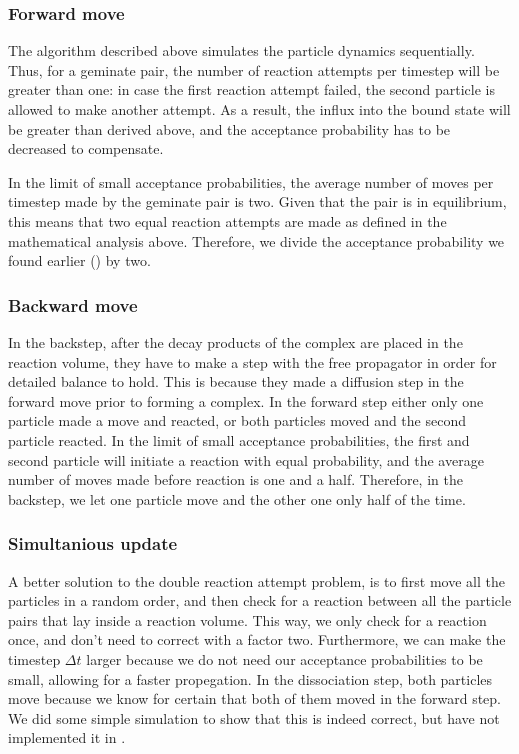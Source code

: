 \subsubsection{Forward move}
The algorithm described above simulates the particle dynamics sequentially. Thus, for a geminate pair, the number of reaction attempts per timestep will be greater than one: in case the first reaction attempt failed, the second particle is allowed to make another attempt. As a result, the influx into the bound state will be greater than derived above, and the acceptance probability has to be decreased to compensate.

In the limit of small acceptance probabilities, the average number of moves per timestep made by the geminate pair is two. Given that the pair is in equilibrium, this means that two equal reaction attempts are made as defined in the mathematical analysis above. Therefore, we divide the acceptance probability we found earlier () by two.

\subsubsection{Backward move}
In the backstep, after the decay products of the complex are placed in the reaction volume, they have to make a step with the free propagator in order for detailed balance to hold. This is because they made a diffusion step in the forward move prior to forming a complex. In the forward step either only one particle made a move and reacted, or both particles moved and the second particle reacted. In the limit of small acceptance probabilities, the first and second particle will initiate a reaction with equal probability, and the average number of moves made before reaction is one and a half. Therefore, in the backstep, we let one particle move and the other one only half of the time.

\subsubsection{Simultanious update}
A better solution to the double reaction attempt problem, is to first move all the particles in a random order, and then check for a reaction between all the particle pairs that lay inside a reaction volume. This way, we only check for a reaction once, and don't need to correct with a factor two. Furthermore, we can make the timestep $\Delta t$ larger because we do not need our acceptance probabilities to be small, allowing for a faster propegation. In the dissociation step, both particles move because we know for certain that both of them moved in the forward step. We did some simple simulation to show that this is indeed correct, but have not implemented it in \GFRD.


